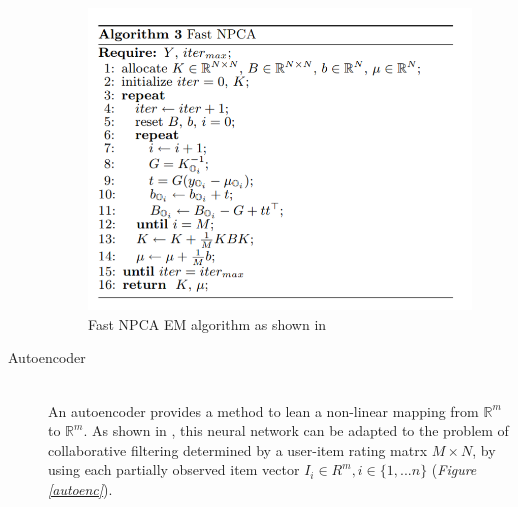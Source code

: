 \documentclass[10pt,conference,compsocconf]{IEEEtran}
\begin{document}
\begin{description}
\begin{figure}[t!]
\centering
\includegraphics[scale=0.6]{emnpca.png}
\caption{Fast NPCA EM algorithm as shown in \cite{npca}}
\label{emnpca}
\end{figure} 

\item[Autoencoder] \ \\
An autoencoder provides a method to lean a non-linear mapping from $\mathbb{R}^{m}$ to $\mathbb{R}^{m}$. As shown in \cite{autorec}, this neural network can be adapted to the problem of collaborative filtering determined by a user-item rating matrx $M \times N$, by using each partially observed item vector $I_{i} \in {R}^{m} , i \in \{1,...n\}$ (\emph{Figure \ref{autoenc}}).


\end{description}
\end{document}
